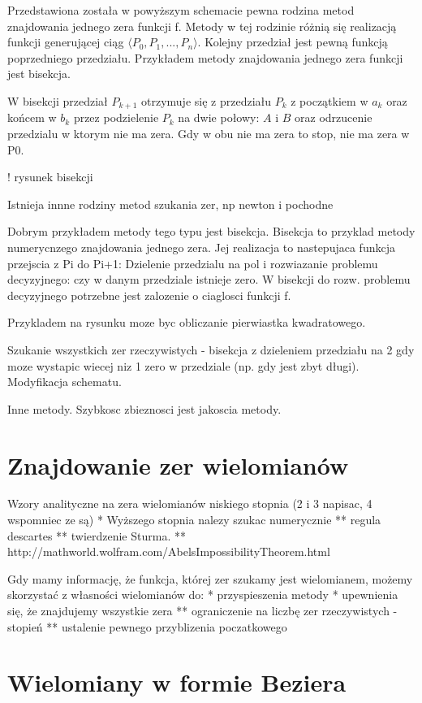 \documentclass[11pt,a4paper,oneside]{report}
\begin{document}
Przedstawiona została w powyższym schemacie pewna rodzina metod znajdowania jednego zera funkcji f. Metody w tej rodzinie różnią się realizacją funkcji generującej ciąg $\langle P_0, P_1, ..., P_n\rangle$. Kolejny przedział jest pewną funkcją poprzedniego przedziału. Przykładem metody znajdowania jednego zera funkcji jest bisekcja.

W bisekcji przedział $P_{k+1}$ otrzymuje się z przedziału $P_k$ z początkiem w $a_k$ oraz końcem w $b_k$ przez podzielenie $P_k$ na dwie połowy: $A$ i $B$ oraz odrzucenie przedzialu w ktorym nie ma zera. Gdy w obu nie ma zera to stop, nie ma zera w P0.

! rysunek bisekcji

Istnieja innne rodziny metod szukania zer, np newton i pochodne

Dobrym przykładem metody tego typu jest bisekcja. Bisekcja to przyklad metody numerycnzego znajdowania jednego zera. Jej realizacja to nastepujaca funkcja przejscia z Pi do Pi+1: Dzielenie przedzialu na pol i rozwiazanie problemu decyzyjnego: czy w danym przedziale istnieje zero. W bisekcji do rozw. problemu decyzyjnego potrzebne jest zalozenie o ciaglosci funkcji f.


Przykladem na rysunku moze byc obliczanie pierwiastka kwadratowego.

Szukanie wszystkich zer rzeczywistych - bisekcja z dzieleniem przedziału na 2 gdy moze wystapic wiecej niz 1 zero w przedziale (np. gdy jest zbyt długi). Modyfikacja schematu.

Inne metody. Szybkosc zbieznosci jest jakoscia metody. 

\section{Znajdowanie zer wielomianów}

Wzory analityczne na zera wielomianów niskiego stopnia (2 i 3 napisac, 4 wspomniec ze są)
* Wyższego stopnia nalezy szukac numerycznie
** regula descartes
** twierdzenie Sturma.
** http://mathworld.wolfram.com/AbelsImpossibilityTheorem.html


Gdy mamy informację, że funkcja, której zer szukamy jest wielomianem, możemy skorzystać z własności wielomianów do:
* przyspieszenia metody
* upewnienia się, że znajdujemy wszystkie zera
** ograniczenie na liczbę zer rzeczywistych - stopień
** ustalenie pewnego przyblizenia poczatkowego



\section{Wielomiany w formie Beziera}
\end{document}

